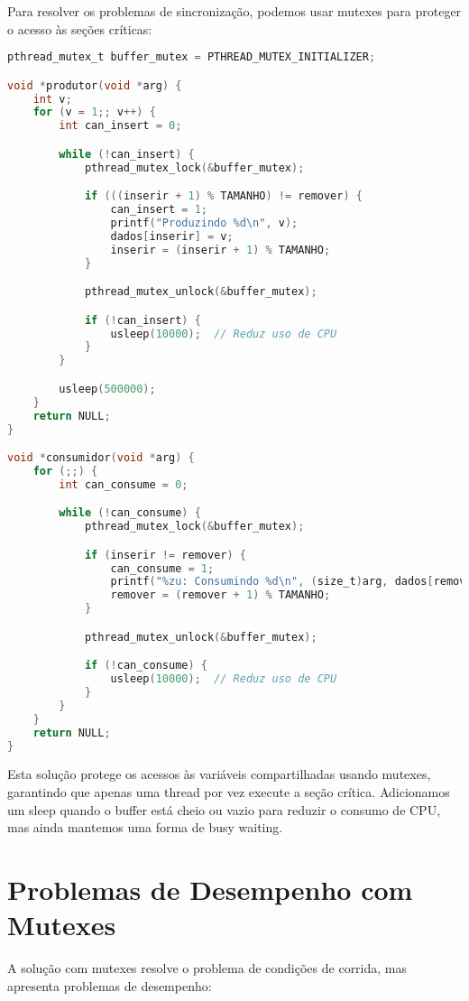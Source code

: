 \documentclass[12pt]{article}
\begin{document}
Para resolver os problemas de sincronização, podemos usar mutexes para proteger o acesso às seções críticas:

\begin{lstlisting}[language=C]
pthread_mutex_t buffer_mutex = PTHREAD_MUTEX_INITIALIZER;

void *produtor(void *arg) {
    int v;
    for (v = 1;; v++) {
        int can_insert = 0;

        while (!can_insert) {
            pthread_mutex_lock(&buffer_mutex);

            if (((inserir + 1) % TAMANHO) != remover) {
                can_insert = 1;
                printf("Produzindo %d\n", v);
                dados[inserir] = v;
                inserir = (inserir + 1) % TAMANHO;
            }

            pthread_mutex_unlock(&buffer_mutex);

            if (!can_insert) {
                usleep(10000);  // Reduz uso de CPU
            }
        }

        usleep(500000);
    }
    return NULL;
}

void *consumidor(void *arg) {
    for (;;) {
        int can_consume = 0;

        while (!can_consume) {
            pthread_mutex_lock(&buffer_mutex);

            if (inserir != remover) {
                can_consume = 1;
                printf("%zu: Consumindo %d\n", (size_t)arg, dados[remover]);
                remover = (remover + 1) % TAMANHO;
            }

            pthread_mutex_unlock(&buffer_mutex);

            if (!can_consume) {
                usleep(10000);  // Reduz uso de CPU
            }
        }
    }
    return NULL;
}
\end{lstlisting}

Esta solução protege os acessos às variáveis compartilhadas usando mutexes, garantindo que apenas uma thread por vez execute a seção crítica. Adicionamos um sleep quando o buffer está cheio ou vazio para reduzir o consumo de CPU, mas ainda mantemos uma forma de busy waiting.

\section{Problemas de Desempenho com Mutexes}

A solução com mutexes resolve o problema de condições de corrida, mas apresenta problemas de desempenho:
\end{document}
